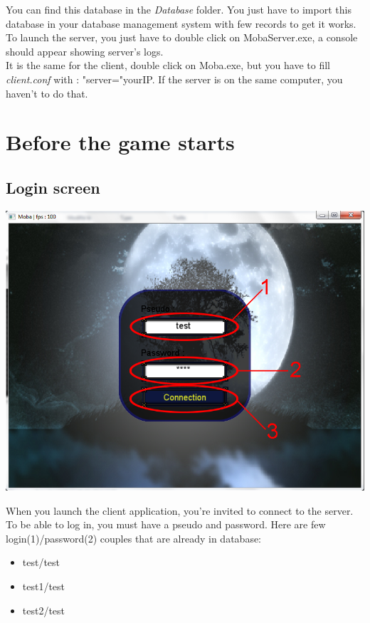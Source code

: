 \documentclass{scrreprt}
\begin{document}
		  You can find this database in the \emph{Database} folder. You just have to import this database in your database management system with few records to get it works.\\

		  To launch the server, you just have to double click on MobaServer.exe, a console should appear showing server's logs.\\
		  It is the same for the client, double click on Moba.exe, but  you have to fill \emph{client.conf} with : "server="yourIP. If the server is on the same computer, you haven't to do that.

		  \chapter{Before the game starts}
		  \section{Login screen}
		  \begin{center}
		  \includegraphics[scale=0.4]{connection_screen.png}
		  \end{center}
		  When you launch the client application, you're invited to connect to the server. To be able to log in, you must have a pseudo and password. Here are few login(1)/password(2) couples that are already in database:
		  \begin{itemize}
		  \item{test/test}
		  \item{test1/test}
		  \item{test2/test}
		  \end{itemize}
\end{document}
